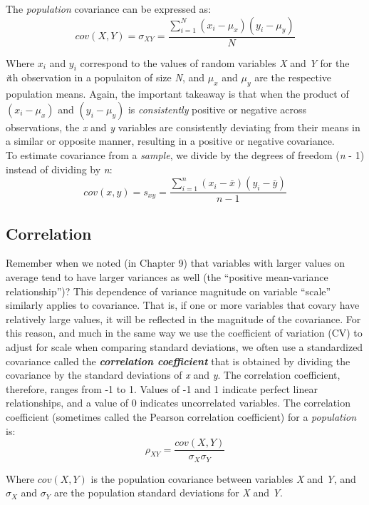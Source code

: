 \documentclass[
]{book}
\begin{document}
The \emph{population} covariance can be expressed as:
\[cov(X,Y)=\sigma_{XY}=\frac{\sum_{i=1}^N (x_i-\mu_x)(y_i-\mu_y)}{N}\]

Where \(x_i\) and \(y_i\) correspond to the values of random variables \emph{X} and \emph{Y} for the \emph{i}th observation in a populaiton of size \emph{N}, and \(\mu_x\) and \(\mu_y\) are the respective population means. Again, the important takeaway is that when the product of \((x_i-\mu_x)\) and \((y_i-\mu_y)\) is \emph{consistently} positive or negative across observations, the \emph{x} and \emph{y} variables are consistently deviating from their means in a similar or opposite manner, resulting in a positive or negative covariance.\\

To estimate covariance from a \emph{sample}, we divide by the degrees of freedom (\emph{n} - 1) instead of dividing by \emph{n}:
\[cov(x,y)=s_{xy}=\frac{\sum_{i=1}^n (x_i-\bar{x})(y_i-\bar{y})}{n-1}\]

\hypertarget{correlation}{%
\subsection{Correlation}\label{correlation}}

Remember when we noted (in Chapter 9) that variables with larger values on average tend to have larger variances as well (the ``positive mean-variance relationship'')? This dependence of variance magnitude on variable ``scale'' similarly applies to covariance. That is, if one or more variables that covary have relatively large values, it will be reflected in the magnitude of the covariance. For this reason, and much in the same way we use the coefficient of variation (CV) to adjust for scale when comparing standard deviations, we often use a standardized covariance called the \textbf{\emph{correlation coefficient}} that is obtained by dividing the covariance by the standard deviations of \emph{x} and \emph{y}. The correlation coefficient, therefore, ranges from -1 to 1. Values of -1 and 1 indicate perfect linear relationships, and a value of 0 indicates uncorrelated variables. The correlation coefficient (sometimes called the Pearson correlation coefficient) for a \emph{population} is:
\[\rho_{XY}=\frac{cov(X,Y)}{\sigma_X\sigma_Y} \]

Where \(cov(X,Y)\) is the population covariance between variables \emph{X} and \emph{Y}, and \(\sigma_X\) and \(\sigma_Y\) are the population standard deviations for \emph{X} and \emph{Y}.
\end{document}
